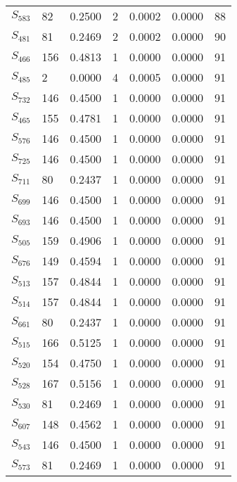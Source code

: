 \begin{xltabular}{\textwidth}{XPPPPPP}
  $S_{583}$ & 82 & 0.2500 & 2 & 0.0002 & 0.0000 & 88 \\ 
  $S_{481}$ & 81 & 0.2469 & 2 & 0.0002 & 0.0000 & 90 \\ 
  $S_{466}$ & 156 & 0.4813 & 1 & 0.0000 & 0.0000 & 91 \\ 
  $S_{485}$ & 2 & 0.0000 & 4 & 0.0005 & 0.0000 & 91 \\ 
  $S_{732}$ & 146 & 0.4500 & 1 & 0.0000 & 0.0000 & 91 \\ 
  $S_{465}$ & 155 & 0.4781 & 1 & 0.0000 & 0.0000 & 91 \\ 
  $S_{576}$ & 146 & 0.4500 & 1 & 0.0000 & 0.0000 & 91 \\ 
  $S_{725}$ & 146 & 0.4500 & 1 & 0.0000 & 0.0000 & 91 \\ 
  $S_{711}$ & 80 & 0.2437 & 1 & 0.0000 & 0.0000 & 91 \\ 
  $S_{699}$ & 146 & 0.4500 & 1 & 0.0000 & 0.0000 & 91 \\ 
  $S_{693}$ & 146 & 0.4500 & 1 & 0.0000 & 0.0000 & 91 \\ 
  $S_{505}$ & 159 & 0.4906 & 1 & 0.0000 & 0.0000 & 91 \\ 
  $S_{676}$ & 149 & 0.4594 & 1 & 0.0000 & 0.0000 & 91 \\ 
  $S_{513}$ & 157 & 0.4844 & 1 & 0.0000 & 0.0000 & 91 \\ 
  $S_{514}$ & 157 & 0.4844 & 1 & 0.0000 & 0.0000 & 91 \\ 
  $S_{661}$ & 80 & 0.2437 & 1 & 0.0000 & 0.0000 & 91 \\ 
  $S_{515}$ & 166 & 0.5125 & 1 & 0.0000 & 0.0000 & 91 \\ 
  $S_{520}$ & 154 & 0.4750 & 1 & 0.0000 & 0.0000 & 91 \\ 
  $S_{528}$ & 167 & 0.5156 & 1 & 0.0000 & 0.0000 & 91 \\ 
  $S_{530}$ & 81 & 0.2469 & 1 & 0.0000 & 0.0000 & 91 \\ 
  $S_{607}$ & 148 & 0.4562 & 1 & 0.0000 & 0.0000 & 91 \\ 
  $S_{543}$ & 146 & 0.4500 & 1 & 0.0000 & 0.0000 & 91 \\ 
  $S_{573}$ & 81 & 0.2469 & 1 & 0.0000 & 0.0000 & 91 \\
        \bottomrule
    \end{xltabular}
    